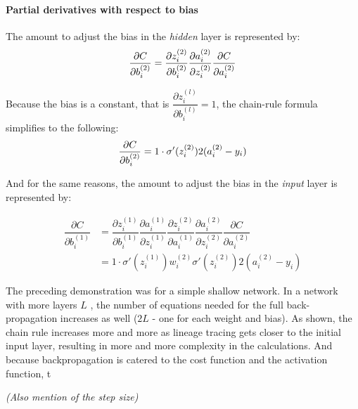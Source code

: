 
\hypertarget{partial-derivatives-with-respect-to-bias}{%
\paragraph{Partial derivatives with respect to
bias}\label{partial-derivatives-with-respect-to-bias}}

The amount to adjust the bias in the \emph{hidden} layer is
represented by: \[
\frac{\partial{C}}{\partial{b_i^{(2)}}}  =  \dfrac{\partial{z_i^{(2)}}}{\partial{b_i^{(2)}}}
     \dfrac{\partial{a_i^{(2)}}}{\partial{z_i^{(2)}}}
     \dfrac{\partial{C}}{\partial{a_i^{(2)}}} \\
\]

Because the bias is a constant, that is
\(\dfrac{\partial{z_i^{(l)}}}{\partial{b_i^{(l)}}} = 1\), the chain-rule
formula simplifies to the following: \[
\frac{\partial{C}}{\partial{b_i^{(2)}}} = 1 \cdot \sigma'(z_i^{(2)}) 2(a_i^{(2)}-y_i) \\
\]

And for the same reasons, the amount to adjust the bias in the \emph{input} layer is
represented by:

    \begin{align*}
\dfrac{\partial{C}}{\partial{b_i^{(1)}}} 
& = \dfrac{\partial{z_i^{(1)}}}{\partial{b_i^{(1)}}} \dfrac{\partial{a_i^{(1)}}}{\partial{z_i^{(1)}}}  \dfrac{\partial{z_i^{(2)}}}{\partial{a_i^{(1)}}}
     \dfrac{\partial{a_i^{(2)}}}{\partial{z_i^{(2)}}}
     \dfrac{\partial{C}}{\partial{a_i^{(2)}}} \\ \nonumber
& = 1 \cdot \sigma'(z_i^{(1)}) w_i^{(2)} \sigma'(z_i^{(2)}) 2(a_i^{(2)}-y_i) \nonumber
    \end{align*}


The preceding demonstration was for a simple shallow network.  In a network with more layers $L$ , the number of equations needed for the full back-propagation increases as well ($2L$ - one for each weight and bias).  As shown, the chain rule increases more and more as lineage tracing gets closer to the initial input layer, resulting in more and more complexity in the calculations.  And because backpropagation is catered to the cost function and the activation function, t

\textit{(Also mention of the step size)}